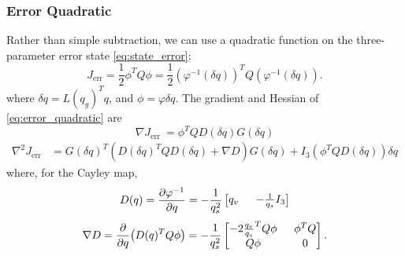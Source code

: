 \documentclass{svproc}
\newcommand{\half}{\frac{1}{2}}
\begin{document}
        \subsubsection{Error Quadratic}
            Rather than simple subtraction, we can use a quadratic function on the three-parameter error state \eqref{eq:state_error}:
            \begin{equation} \label{eq:error_quadratic}
                J_\text{err} = \half \phi^T Q \phi = \half \left(\varphi^{-1}(\delta q)\right)^T Q \left(\varphi^{-1}(\delta q)\right).
            \end{equation}
            where $\delta q = L(q_g)^T q$, and $\phi = \varphi{\delta q}$. The gradient and Hessian of \eqref{eq:error_quadratic} are 
            \begin{equation}
                \nabla J_\text{err }= \phi^T Q  D(\delta q)  G(\delta q)
            \end{equation}
            \begin{equation}
                \begin{aligned}
                     \nabla^2 J_\text{err} &= 
                        G(\delta q)^T \! \left(
                        D(\delta q)^T Q D(\delta q) + \nabla D \right) G(\delta q) 
                      + I_3 (\phi^T Q  D(\delta q)) \delta q %
                \end{aligned}
            \end{equation}
            where, for the Cayley map,
            \begin{equation}
                D(q) = \pdv{\varphi^{-1}}{q} = -\frac{1}{q_s^2}\begin{bmatrix}
                    q_v \;\; & -\frac{1}{q_s} I_3
                \end{bmatrix}
            \end{equation}
            \begin{equation}
                \nabla D = \pdv{q}(D(q)^T Q \phi) 
                = -\frac{1}{q_s^2} \begin{bmatrix} -2 \frac{q_v}{q_s}^T Q \phi \;\;  & \phi^T Q \\
                                   Q \phi \;\; & 0 \\
                \end{bmatrix}.
            \end{equation}
            
\end{document}
